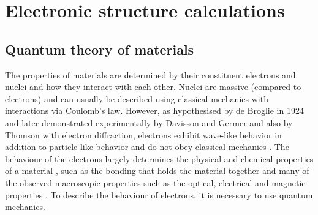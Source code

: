 \documentclass[11pt, twoside]{report}
\begin{document}
\section{Electronic structure calculations}\label{elec_struc}

\subsection{Quantum theory of materials}


The properties of materials are determined by their constituent electrons and nuclei and how they interact with each other. Nuclei are massive (compared to electrons) and can usually be described using classical mechanics with interactions via Coulomb's law. However, as hypothesised by de Broglie in 1924 and later demonstrated experimentally by Davisson and Germer and also by Thomson with electron diffraction, electrons exhibit wave-like behavior in addition to particle-like behavior and do not obey classical mechanics \cite{quantum_intro}. The behaviour of the electrons largely determines the physical and chemical properties of a material \cite{Prasad_ch2}, such as the bonding that holds the material together and many of the observed macroscopic properties such as the optical, electrical and magnetic properties \cite{RichardMartin_Ch1}. To describe the behaviour of electrons, it is necessary to use quantum mechanics.
\end{document}

